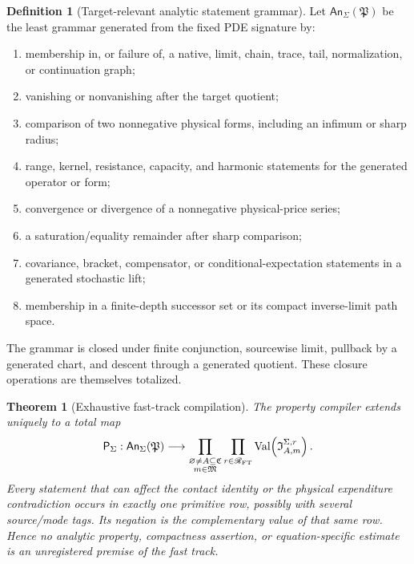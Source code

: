 \documentclass[11pt]{article}
\numberwithin{section}{part}
\theoremstyle{plain}
\newtheorem{theorem}{Theorem}[section]
\theoremstyle{definition}
\newtheorem{definition}[definition]{Definition}
\theoremstyle{remark}
\newcommand{\Channels}{\mathfrak C}
\newcommand{\Modes}{\mathfrak M}
\begin{document}
\begin{definition}[Target-relevant analytic statement grammar]
\label{def:target-relevant-statement-grammar}
Let \(\mathsf{An}_\Sigma(\mathfrak P)\) be the least grammar generated from
the fixed PDE signature by:
\begin{enumerate}[label=\textup{(A\arabic*)}]
\item membership in, or failure of, a native, limit, chain, trace, tail,
  normalization, or continuation graph;
\item vanishing or nonvanishing after the target quotient;
\item comparison of two nonnegative physical forms, including an infimum or
  sharp radius;
\item range, kernel, resistance, capacity, and harmonic statements for the
  generated operator or form;
\item convergence or divergence of a nonnegative physical-price series;
\item a saturation/equality remainder after sharp comparison;
\item covariance, bracket, compensator, or conditional-expectation statements
  in a generated stochastic lift;
\item membership in a finite-depth successor set or its compact inverse-limit
  path space.
\end{enumerate}
The grammar is closed under finite conjunction, sourcewise limit, pullback by
a generated chart, and descent through a generated quotient.  These closure
operations are themselves totalized.
\end{definition}

\begin{theorem}[Exhaustive fast-track compilation]
\label{thm:exhaustive-fast-track-compilation}
The property compiler extends uniquely to a total map
\begin{equation}
 \label{eq:total-fast-track-compiler}
 \mathsf P_\Sigma:
 \mathsf{An}_\Sigma(\mathfrak P)\longrightarrow
 \prod_{\substack{\varnothing\ne A\subseteq\Channels\\m\in\Modes}}
 \prod_{r\in\mathscr R_{\rm FT}}
 \operatorname{Val}\!\left(\mathfrak I_{A,m}^{\Sigma,r}\right).
\end{equation}
Every statement that can affect the contact identity or the physical
expenditure contradiction occurs in exactly one primitive row, possibly with
several source/mode tags.  Its negation is the complementary value of that
same row.  Hence no analytic property, compactness assertion, or
equation-specific estimate is an unregistered premise of the fast track.
\end{theorem}
\end{document}
